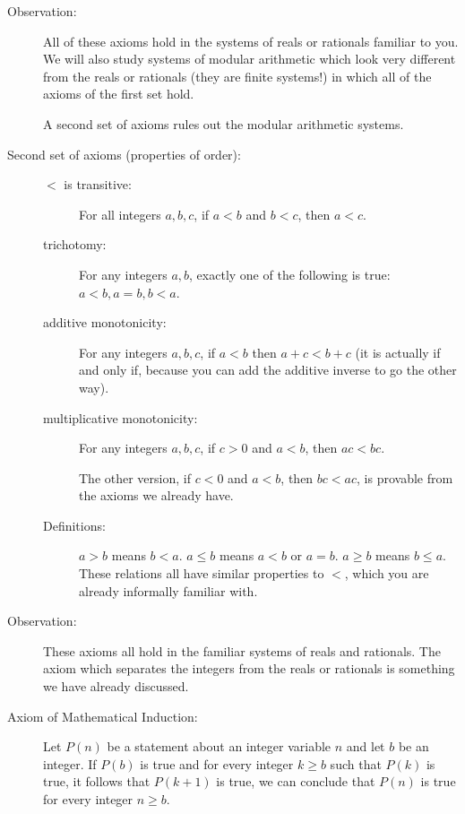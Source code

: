 \documentclass[12pt]{article}
\begin{document}
\begin{description}
\begin{description}
\end{description}

\item[Observation:]  All of these axioms hold in the systems of reals or rationals familiar to you.  We will also 
study systems of modular arithmetic which look very different from the reals or rationals (they are finite systems!) in which all of the axioms of the first set hold.

A second set of axioms rules out the modular arithmetic systems.

\item[Second set of axioms (properties of order):]

\begin{description}

\item[$<$ is transitive:]  For all integers $a,b,c$, if $a<b$ and $b<c$, then $a<c$.

\item[trichotomy:]  For any integers $a,b$, exactly one of the following is true:  $a<b, a=b, b<a$.

\item[additive monotonicity:]  For any integers $a,b,c$, if $a<b$ then $a+c<b+c$ (it is actually if and only if, because you can add the additive inverse to go the other way).

\item[multiplicative monotonicity:]  For any integers $a,b,c$, if $c>0$ and $a<b$, then $ac<bc$.

The other version, if $c<0$ and $a<b$, then $bc<ac$, is provable from the axioms we already have.

\item[Definitions:]  $a>b$ means $b<a$.  $a \leq b$ means $a<b$ or $a=b$.  $a \geq b$ means $b \leq a$.
These relations all have similar properties to $<$, which you are already informally familiar with.

\end{description}

\item[Observation:]  These axioms all hold in the familiar systems of reals and rationals.  The axiom which separates
the integers from the reals or rationals is something we have already discussed.

\item[Axiom of Mathematical Induction:]  Let $P(n)$ be a statement about an integer variable $n$ and let
$b$ be an integer.  If $P(b)$ is true and for every integer $k \geq b$ such that $P(k)$ is true, it follows that $P(k+1)$ is true,
we can conclude that $P(n)$ is true for every integer $n \geq b$.


\end{description}
\end{document}
